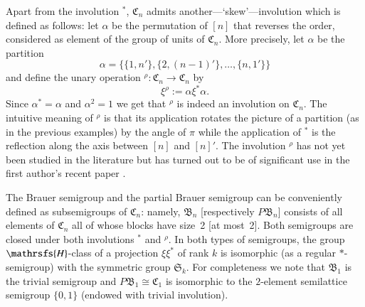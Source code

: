 \documentclass[preprint,1p,times]{elsarticle}
\numberwithin{equation}{section}
\theoremstyle{remark}
\def\Hc{\mathrsfs{H}}
\def\C{\mathfrak{C}}
\def\B{\mathfrak{B}}
\def\Sim{\mathfrak{S}}
\begin{document}
Apart from the involution ${}^*$,  $\C_n$ admits another---`skew'---involution which is defined as follows: let
$\alpha$ be the permutation of $[n]$ that reverses the order, considered as element of the group of units of $\C_n$.
More precisely, let $\alpha$ be the partition
$$\alpha=\{\{1,n'\}, \{2,(n-1)'\},\dots,\{n,1'\}\}$$ and define the unary operation $^\rho:\C_n\to \C_n$ by
$$\xi^{\rho}:= \alpha\xi^*\alpha.$$
Since $\alpha^*=\alpha$ and $\alpha^2=1$ we get that $^\rho$ is indeed an involution on $\C_n$. The intuitive meaning
of $^\rho$ is that its application rotates the picture of a partition (as in the previous examples) by the angle of
$\pi$ while the application of ${}^*$ is the reflection along the axis between $[n]$ and $[n]'$. The involution $^\rho$
has not {yet been studied} in the literature but has turned out to be of significant use in the first author's recent
paper \cite{pseudovarieties}.

The Brauer semigroup and the partial Brauer semigroup can be conveniently defined as subsemigroups of $\C_n$: namely,
$\B_n$ [respectively $P\B_n$] consists of all elements of $\C_n$ all of whose blocks have size~2 [at most~2]. Both
semigroups are closed under both involutions $^*$ and ${}^\rho$. In both types of semigroups, the group $\Hc$-class of
a projection $\xi\xi^*$ of rank $k$ is isomorphic (as a regular $*$-semigroup) with the symmetric group $\Sim_k$. For
completeness we note that $\B_1$ is the trivial semigroup and $P\B_1\cong \C_1$ is isomorphic to the $2$-element
semilattice semigroup $\{0,1\}$ (endowed with trivial involution).
\end{document}
